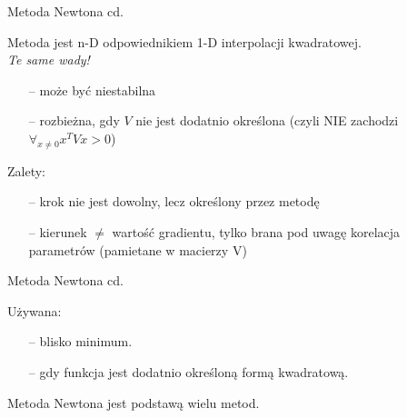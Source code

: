   \begin{frame}{Metoda Newtona cd.}

    \begin{block}{}
    Metoda jest n-D odpowiednikiem 1-D interpolacji kwadratowej.
      \smallskip
	  \\ \emph{Te same wady!}
	  \begin{itemize}
	  	\item[--] może być niestabilna
	  	\item[--] rozbieżna, gdy $V$ nie jest dodatnio określona (czyli NIE zachodzi $\forall_{x\ne 0} x^TVx>0$)
	  \end{itemize}
	\end{block}
    \begin{block}{Zalety:}
      \begin{itemize}
	  	\item[--] krok nie jest dowolny, lecz określony przez metodę
	  	\item[--] kierunek $\neq$ wartość gradientu, tylko brana pod uwagę korelacja parametrów (pamietane w macierzy V)
	  \end{itemize}
	\end{block}

  \end{frame}

  \begin{frame}{Metoda Newtona cd.}

	\begin{block}{Używana:}
      \begin{itemize}
	  	\item[--] blisko minimum.
	  	\item[--] gdy funkcja jest dodatnio określoną formą kwadratową.
	  \end{itemize}
	\end{block}
	\begin{block}{}
	    Metoda Newtona jest podstawą wielu metod.
	\end{block}

  \end{frame}

